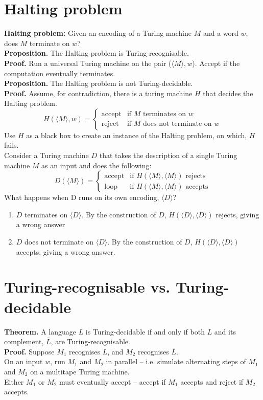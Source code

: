 \documentclass{article}
\begin{document}
\section{Halting problem}
\textbf{Halting problem:} Given an encoding of a Turing machine $M$ and a word $w$, does $M$ terminate on $w$?\medskip
\\\textbf{Proposition.} The Halting problem is Turing-recognisable.
\\\textbf{Proof.} Run a universal Turing machine on the pair ($\langle M\rangle, w$). Accept if the computation eventually terminates.\medskip
\\\textbf{Proposition.} The Halting problem is not Turing-decidable.
\\\textbf{Proof.} Assume, for contradiction, there is a turing machine $H$ that decides the Halting problem.
\begin{equation*}
H(\langle M \rangle, w) =
	\begin{cases}
		\text{accept} & \text{if } M \text{ terminates on } w \\
		\text{reject} & \text{if } M \text{ does not terminate on } w
	\end{cases}
\end{equation*}
Use $H$ as a black box to create an instance of the Halting problem, on which, $H$ fails.
\\Consider a Turing machine $D$ that takes the description of a single Turing machine $M$ as an input and does the following:
\begin{equation*}
D(\langle M\rangle) =
	\begin{cases}
		\text{accept} & \text{if } H(\langle M\rangle, \langle M\rangle) \text{ rejects}\\
		\text{loop} & \text{if } H(\langle M\rangle, \langle M\rangle) \text{ accepts}
	\end{cases}
\end{equation*}
What happens when D runs on its own encoding, $\langle D\rangle$?
\begin{enumerate}
	\item $D$ terminates on $\langle D\rangle$. By the construction of $D$, $H(\langle D\rangle, \langle D\rangle)$ rejects, giving a wrong answer
	\item $D$ does not terminate on $\langle D\rangle$. By the construction of $D$, $H(\langle D\rangle, \langle D\rangle)$ accepts, giving a wrong answer.
\end{enumerate}

\section{Turing-recognisable vs. Turing-decidable}
\textbf{Theorem.} A language $L$ is Turing-decidable if and only if both $L$ and its complement, $\bar{L}$, are Turing-recognisable.
\\\textbf{Proof.} Suppose $M_1$ recognises $L$, and $M_2$ recognises $\bar{L}$.
\\On an input $w$, run $M_1$ and $M_2$ in parallel -- i.e. simulate alternating steps of $M_1$ and $M_2$ on a multitape Turing machine.
\\Either $M_1$ or $M_2$ must eventually accept -- accept if $M_1$ accepts and reject if $M_2$ accepts.
\end{document}
